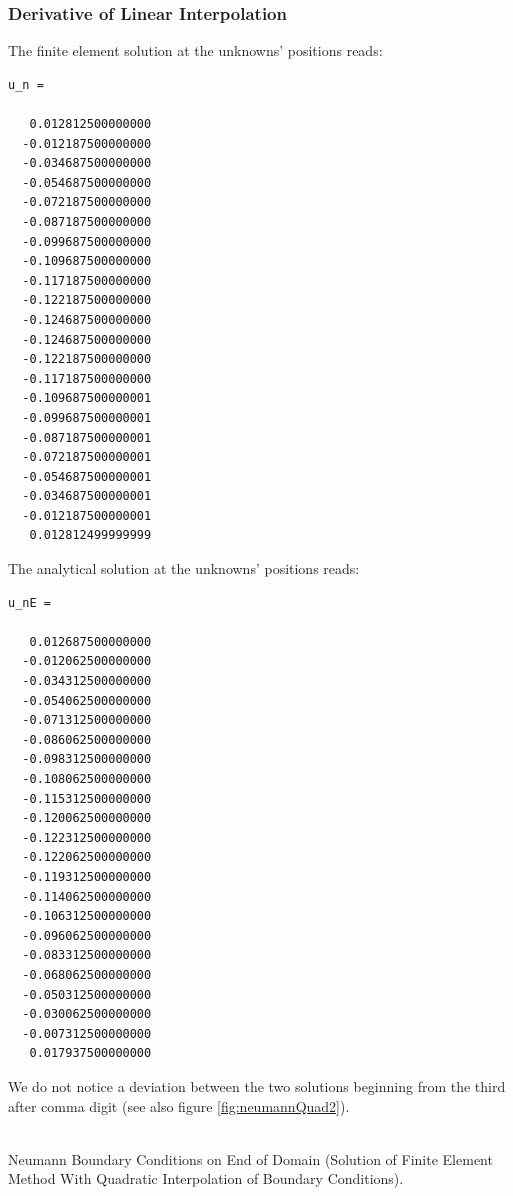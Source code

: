 \documentclass[a4paper,12pt]{article}
\makeatletter
\newenvironment{figurehere}
  {\def\@captype{figure}}
  {}
\makeatother
\begin{document}
\subsubsection{Derivative of Linear Interpolation}
The finite element solution at the unknowns' positions reads:
\begin{verbatim}
u_n =

   0.012812500000000
  -0.012187500000000
  -0.034687500000000
  -0.054687500000000
  -0.072187500000000
  -0.087187500000000
  -0.099687500000000
  -0.109687500000000
  -0.117187500000000
  -0.122187500000000
  -0.124687500000000
  -0.124687500000000
  -0.122187500000000
  -0.117187500000000
  -0.109687500000001
  -0.099687500000001
  -0.087187500000001
  -0.072187500000001
  -0.054687500000001
  -0.034687500000001
  -0.012187500000001
   0.012812499999999
\end{verbatim}
The analytical solution at the unknowns' positions reads:
\begin{verbatim}
u_nE =

   0.012687500000000
  -0.012062500000000
  -0.034312500000000
  -0.054062500000000
  -0.071312500000000
  -0.086062500000000
  -0.098312500000000
  -0.108062500000000
  -0.115312500000000
  -0.120062500000000
  -0.122312500000000
  -0.122062500000000
  -0.119312500000000
  -0.114062500000000
  -0.106312500000000
  -0.096062500000000
  -0.083312500000000
  -0.068062500000000
  -0.050312500000000
  -0.030062500000000
  -0.007312500000000
   0.017937500000000
\end{verbatim}
We do not notice a deviation between the two solutions beginning from the third after comma digit (see also figure \ref{fig:neumannQuad2}).
\begin{center}
\begin{figurehere} 
\\
\caption{Neumann Boundary Conditions on End of Domain (Solution of Finite Element Method With Quadratic Interpolation of Boundary Conditions).}\label{fig:neumannQuad2}
\end{figurehere}
\end{center}
\end{document}
